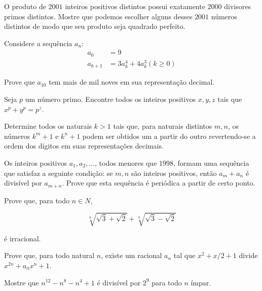 \begin{questao}
  O produto de $2001$ inteiros positivos distintos possui exatamente
  $2000$ divisores primos distintos. Mostre que podemos escolher
  alguns desses $2001$ números distintos de modo que seu produto
  seja quadrado perfeito.
\end{questao}

\begin{questao}
  Considere a sequência $a_n$:
  \begin{align*}
    a_0 & = 9\\
    a_{k+1} & = 3a_k^4 + 4a_k^3 (k \geq 0)
  \end{align*}

  Prove que $a_{10}$ tem mais de mil noves em sua representação decimal.
\end{questao}

\begin{questao}
  Seja $p$ um número primo. Encontre todos os inteiros positivos
  $x,y,z$ tais que $x^p+y^p=p^z$.
\end{questao}

\begin{questao}
  Determine todos os naturais $k>1$ tais que, para naturais
  distintos $m,n$, os números $k^m+1$ e $k^n+1$ podem ser
  obtidos um a partir do outro revertendo-se a ordem dos dígitos em
  suas representações decimais.
\end{questao}

\begin{questao}
  Os inteiros positivos $a_1,a_2,\ldots$, todos menores que
  $1998$, formam uma sequência que satisfaz a seguinte condição: se
  $m,n$ são inteiros positivos, então $a_m+a_n$ é divisível por
  $a_{m+n}$. Prove que esta sequência é periódica a partir de certo
  ponto.
\end{questao}

\begin{questao}
  Prove que, para todo $n \in N$, 

  $$ \sqrt[n]{\sqrt{3}+\sqrt{2}} + \sqrt[n]{\sqrt{3}-\sqrt{2}} $$

  é irracional.
\end{questao}

\begin{questao}
  Prove que, para todo natural $n$, existe um racional $a_n$ tal
  que $x^2+x/2+1$ divide $x^{2n}+a_nx^n+1$.
\end{questao}

\begin{questao}
  Mostre que $n^{12}-n^8-n^4+1$ é divisível por $2^9$ para todo
  $n$ ímpar.
\end{questao}

